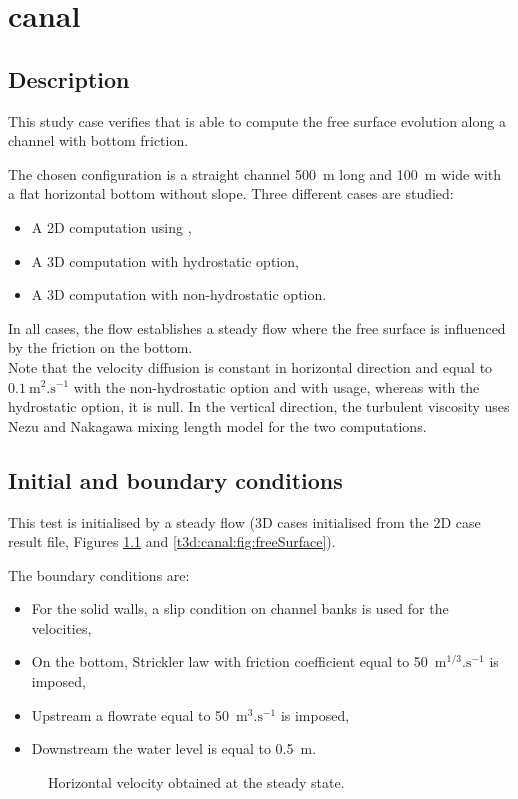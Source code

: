 \chapter{canal}

\section{Description}
\bigskip
This study case verifies that  is able to compute the free
surface evolution along a channel with bottom friction.

\bigskip
The chosen configuration is a straight channel 500~m long and 100~m wide
with a flat horizontal bottom without slope.
Three different cases are studied:
\begin{itemize}
\item A 2D computation using ,
\item A 3D computation with hydrostatic option,
\item A 3D computation with non-hydrostatic option.
\end{itemize}
In all cases, the flow establishes a steady flow where the free surface
is influenced by the friction on the bottom. \\
Note that the velocity diffusion is constant in horizontal direction
and equal to $0.1~\text{m}^2.\text{s}^{-1}$ with the non-hydrostatic 
option and with  usage, whereas with the hydrostatic option, 
it is null. In the vertical direction, the turbulent viscosity uses 
Nezu and Nakagawa mixing length model for the two  computations.

\section{Initial and boundary conditions}

\bigskip
This test is initialised by a steady flow (3D cases initialised 
from the 2D case result file, Figures 
\ref{t3d:canal:fig:veloH} and \ref{t3d:canal:fig:freeSurface}).

\bigskip
The boundary conditions are:
\begin{itemize}
\item For the solid walls, a slip condition on channel banks is used for the velocities,
\item On the bottom, Strickler law with friction coefficient equal to
50~$\text{m}^{1/3}.\text{s}^{-1}$ is imposed,
\item Upstream a flowrate equal to 50~$\text{m}^{3}.\text{s}^{-1}$ is imposed,
\item Downstream the water level is equal to 0.5~m.
\end{itemize}
\begin{figure}[!htbp]
 \centering
 \caption{Horizontal velocity obtained at the steady state.}
 \label{t3d:canal:fig:veloH}
\end{figure}

